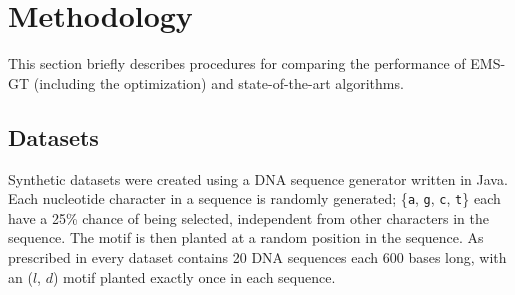 \documentclass[oneside,12pt]{DISCSthesis}
\begin{document}
{		%


				

\chapter{Methodology}
	This section briefly describes procedures for comparing the performance of EMS-GT (including the optimization) and state-of-the-art algorithms.

	\section{Datasets}
		Synthetic datasets were created using a DNA sequence generator written in Java. Each nucleotide character in a sequence is randomly generated; \{\texttt{a}, \texttt{g}, \texttt{c}, \texttt{t}\} each have a 25\% chance of being selected, independent from other characters in the sequence.
		The motif is then planted at a random position in the sequence. As prescribed in \cite{pevzner2000combinatorial} every dataset contains 20 DNA sequences each 600 bases long, with an ($l$, $d$) motif planted exactly once in each sequence.

}
\end{document}
